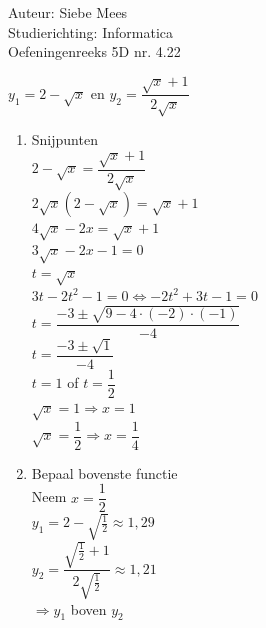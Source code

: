 \documentclass[a4paper]{article}
\begin{document}
  
\noindent \large Auteur: Siebe Mees \\
\noindent \large Studierichting: Informatica\\
\noindent \large Oefeningenreeks 5D nr. 4.22\\

\medskip

\normalsize

$y_1 = 2 - \sqrt{x} $ en  $ y_2 = \dfrac{\sqrt{x} + 1}{2\sqrt{x}}$\\

\begin{enumerate}

\item Snijpunten \\

$2 - \sqrt{x} = \dfrac{\sqrt{x} + 1}{2\sqrt{x}}$\\

$2\sqrt{x}(2 - \sqrt{x}) = \sqrt{x} + 1$\\

$4\sqrt{x} - 2x = \sqrt{x} + 1$\\

$3\sqrt{x} - 2x - 1 = 0$\\

$t = \sqrt{x}$\\

$3t - 2t^2 - 1 = 0 \Longleftrightarrow -2t^2 + 3t - 1 = 0$\\

$t = \dfrac{-3 \pm \sqrt{9 - 4\cdot(-2)\cdot(-1)}}{-4}$\\

$t = \dfrac{-3 \pm \sqrt{1}}{-4}$\\

$t = 1 $ of $ t = \dfrac{1}{2}$\\

$\sqrt{x} = 1 \Rightarrow x = 1$\\

$\sqrt{x} = \dfrac{1}{2} \Rightarrow x = \dfrac{1}{4}$\\

\item Bepaal bovenste functie\\

Neem $ x = \dfrac{1}{2} $\\

$y_1 = 2 - \sqrt{\tfrac{1}{2}} \approx 1,29$\\

$y_2 = \dfrac{\sqrt{\tfrac{1}{2}} + 1}{2\sqrt{\tfrac{1}{2}}} \approx 1,21$\\

$\Rightarrow y_1 $ boven $  y_2$\\

\end{enumerate}
\end{document}
